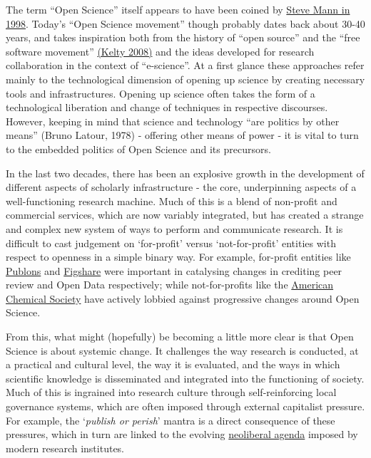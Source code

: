 \documentclass[]{book}
\begin{document}
The term ``Open Science'' itself appears to have been coined by \href{https://en.wikipedia.org/wiki/Open_science\#Coining_of_phrase_\%22OpenScience\%22}{Steve Mann in 1998}. Today's ``Open Science movement'' though probably dates back about 30-40 years, and takes inspiration both from the history of ``open source'' and the ``free software movement'' \href{https://www.twobits.net/pub/Kelty-TwoBits.pdf}{(Kelty 2008)} and the ideas developed for research collaboration in the context of ``e-science''. At a first glance these approaches refer mainly to the technological dimension of opening up science by creating necessary tools and infrastructures. Opening up science often takes the form of a technological liberation and change of techniques in respective discourses. However, keeping in mind that science and technology ``are politics by other means'' (Bruno Latour, 1978) - offering other means of power - it is vital to turn to the embedded politics of Open Science and its precursors.

In the last two decades, there has been an explosive growth in the development of different aspects of scholarly infrastructure - the core, underpinning aspects of a well-functioning research machine. Much of this is a blend of non-profit and commercial services, which are now variably integrated, but has created a strange and complex new system of ways to perform and communicate research. It is difficult to cast judgement on `for-profit' versus `not-for-profit' entities with respect to openness in a simple binary way. For example, for-profit entities like \href{https://publons.com/}{Publons} and \href{https://figshare.com/}{Figshare} were important in catalysing changes in crediting peer review and Open Data respectively; while not-for-profits like the \href{https://www.scientificamerican.com/article/open-access-to-science-un/}{American Chemical Society} have actively lobbied against progressive changes around Open Science.

From this, what might (hopefully) be becoming a little more clear is that Open Science is about systemic change. It challenges the way research is conducted, at a practical and cultural level, the way it is evaluated, and the ways in which scientific knowledge is disseminated and integrated into the functioning of society. Much of this is ingrained into research culture through self-reinforcing local governance systems, which are often imposed through external capitalist pressure. For example, the `\emph{publish or perish}' mantra is a direct consequence of these pressures, which in turn are linked to the evolving \href{https://opinionator.blogs.nytimes.com/2009/03/08/neoliberalism-and-higher-education/}{neoliberal agenda} imposed by modern research institutes.
\end{document}
